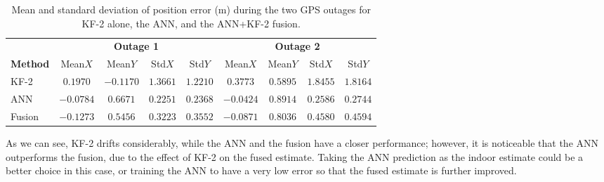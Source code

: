\documentclass[11pt,a4paper]{article}
\begin{document}
\begin{table}[H]
\centering
\setlength{\tabcolsep}{5pt}
\begin{tabular}{l cccc cccc}
\toprule
& \multicolumn{4}{c}{\textbf{Outage 1}} & \multicolumn{4}{c}{\textbf{Outage 2}}\\
\cmidrule(lr){2-5}\cmidrule(lr){6-9}
\textbf{Method} & Mean$X$ & Mean$Y$ & Std$X$ & Std$Y$
                & Mean$X$ & Mean$Y$ & Std$X$ & Std$Y$\\
\midrule
KF-2   & $0.1970$  & $-0.1170$ & $1.3661$ & $1.2210$ & $0.3773$  & $0.5895$ & $1.8455$ & $1.8164$\\
ANN    & $-0.0784$ & $0.6671$  & $0.2251$ & $0.2368$ & $-0.0424$ & $0.8914$ & $0.2586$ & $0.2744$\\
Fusion & $-0.1273$ & $0.5456$  & $0.3223$ & $0.3552$ & $-0.0871$ & $0.8036$ & $0.4580$ & $0.4594$\\
\bottomrule
\end{tabular}
\caption{Mean and standard deviation of position error (m) during the two GPS
outages for KF-2 alone, the ANN, and the ANN+KF-2 fusion.}
\label{tab:ann}
\end{table}

As we can see, KF-2 drifts considerably, while the ANN and the fusion have a closer
performance; however, it is noticeable that the ANN outperforms the fusion, due to
the effect of KF-2 on the fused estimate. Taking the ANN prediction as the indoor
estimate could be a better choice in this case, or training the ANN to have a very
low error so that the fused estimate is further improved.
\end{document}
